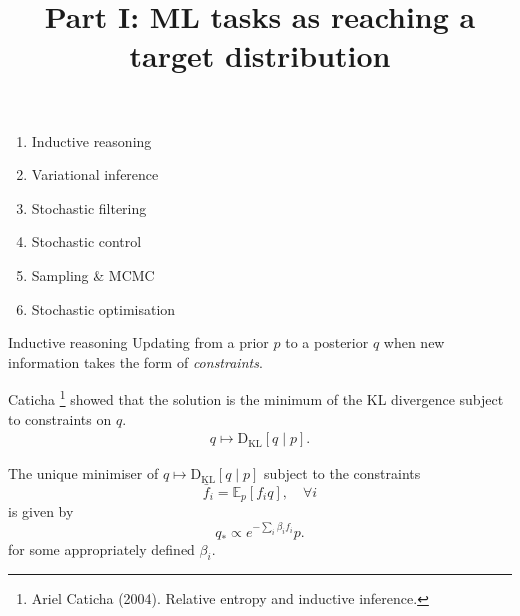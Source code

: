 \documentclass{beamer}
\newcommand{\E}{\mathbb E}
\newcommand{\dkl}{\operatorname{D_{K L}}}
\begin{document}
\begin{frame}{}
\title{Part I: ML tasks as reaching a target distribution}
\author{\vspace{-5ex}}
\institute{\vspace{-5ex}}
\date{\vspace{-5ex}}
    \maketitle
    \small
\begin{enumerate}
    \item Inductive reasoning
    \item Variational inference
    \item Stochastic filtering
    \item Stochastic control
    \item Sampling \& MCMC
    \item Stochastic optimisation
\end{enumerate}
\end{frame}

\begin{frame}{Inductive reasoning}
\small 
    Updating from a prior $p$ to a posterior $q$ when new information takes the form of \textit{constraints}.
    
    Caticha
    \footnote{Ariel Caticha (2004). Relative entropy and inductive inference.} showed that the solution is the minimum of the KL divergence subject to constraints on $q$.
    \begin{align*}
  q \mapsto  \dkl[q \mid p].
    \end{align*}
    
    

\begin{theorem}
The unique minimiser of \(q \mapsto  \dkl[q \mid p]\) subject to the constraints
\begin{equation*}
\bar{f}_{i}= \E_p[ f_i q], \quad  \forall i
\end{equation*}
is given by
\begin{equation*}
q_{*} \propto e^{-\sum_{i} \beta_i {f}_{i}} p.
\end{equation*}
for some appropriately defined $\beta_i$.
\end{theorem}
\end{frame}
\end{document}
